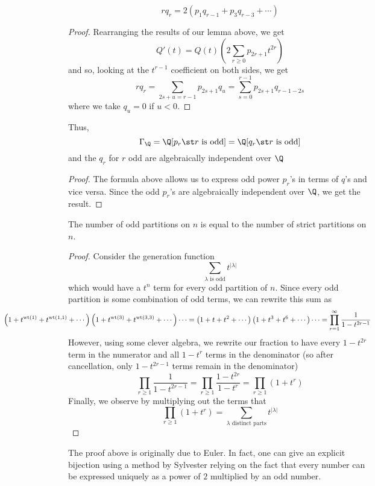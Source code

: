 \documentclass[11pt,leqno,oneside]{amsart}
\numberwithin{thm}{section}
\newcommand{\wt}{\operatorname{wt}}
\begin{document}
\begin{prop}
  \[
    rq_r = 2(p_1 q_{r-1} + p_3 q_{r-3} + \cdots)
  \]
\end{prop}
\begin{proof}
  Rearranging the results of our lemma above, we get \[
    Q'(t) = Q(t)\left(2 \sum_{r \geq 0} p_{2r+1} t^{2r}  \right)
  \]
  and so, looking at the \(t^{r-1}\) coefficient on both sides, we get \[
    r q_r = \sum_{2s+u = r-1} p_{2s+1} q_u = \sum_{s=0}^{r-1} p_{2s+1}
    q_{r-1-2s}
  \]
  where we take \(q_u = 0\) if \(u < 0\).
\end{proof}
\begin{cor}\label{gamma-spanned-by-odd}
  Thus, \[
    \Gamma_\Q = \Q[p_r \st r \text{ is odd}] = \Q[q_r \st r \text{ is odd}]
  \]
  and the \(q_r\) for \(r\) odd are algebraically independent over \(\Q\)
\end{cor}
\begin{proof}
  The formula above allows us to express odd power \(p_r\)'s in terms
  of \(q\)'s and vice versa. Since the odd \(p_r\)'s are algebraically
  independent over \(\Q\), we get the result.
\end{proof}
\begin{lem}
  The number of odd partitions on \(n\) is equal to the number of
  strict partitions on \(n\).
\end{lem}
\begin{proof}
  Consider the generation function \[
    \sum_{\lambda \text{ is odd}} t^{|\lambda|}
  \]
  which would have a \(t^n\) term for every odd partition of
  \(n\). Since every odd partition is some combination of odd terms,
  we can rewrite this sum as \[
    \hspace{-1.25in}\left( 1 + t^{\wt(1)} + t^{\wt(1,1)} + \cdots
    \right)\left( 1 + 
      t^{\wt(3)} + t^{\wt(3,3)} + \cdots \right) \cdots = \left(
      1+t+t^2+\cdots \right)\left( 1+t^3+t^6+\cdots \right) \cdots =
    \prod_{r=1}^\infty \frac{1}{1-t^{2r-1}}
  \]
  However, using some clever algebra, we rewrite our fraction to have
  every \(1-t^{2r}\) term in the numerator and all \(1-t^r\) terms in
  the denominator (so after cancellation, only \(1-t^{2r-1}\) terms
  remain in the denominator) \[
    \prod_{r \geq 1} \frac{1}{1-t^{2r-1}} = \prod_{r \geq 1}
    \frac{1-t^{2r}}{1-t^r} = \prod_{r \geq 1} (1+t^r)
  \]
  Finally, we observe by multiplying out the terms that \[
    \prod_{r \geq 1} (1+t^r) = \sum_{\lambda \text{ distinct parts}}
    t^{|\lambda|} 
  \]
\end{proof}
\begin{rmk}
  The proof above is originally due to Euler. In fact, one can
  give an explicit bijection using a method by Sylvester relying on
  the fact that every number can be expressed uniquely as a power of
  \(2\) multiplied by an odd number.
\end{rmk}
\end{document}
